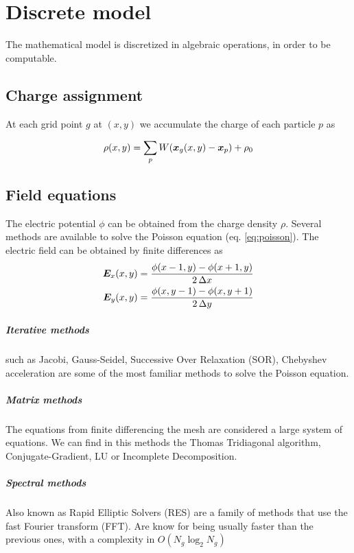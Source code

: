\chapter{Discrete model}
\label{ch:discrete-model}

The mathematical model is discretized in algebraic operations, in order to be 
computable.

\section{Charge assignment}

At each grid point $g$ at $(x,y)$ we accumulate the charge of each particle $p$ 
as

\begin{equation}
\rho(x, y) = \sum_p W(\bm{x}_g(x, y) - \bm{x}_p) + \rho_0
\end{equation}

\section{Field equations}

The electric potential $\phi$ can be obtained from the charge density $\rho$.  
Several methods are available to solve the Poisson equation (eq.  
\ref{eq:poisson}).
%
The electric field can be obtained by finite differences as
%
\begin{align}
\bm{E}_x(x,y) &= \frac{\phi(x-1,y) - \phi(x+1,y)}{2\,\Delta x} \\
\bm{E}_y(x,y) &= \frac{\phi(x,y-1) - \phi(x,y+1)}{2\,\Delta y}
\end{align}

\paragraph{Iterative  methods} such as Jacobi, Gauss-Seidel, Successive Over 
Relaxation (SOR), Chebyshev acceleration are some of the most familiar methods 
to solve the Poisson equation.

\paragraph{Matrix methods} The equations from finite differencing the mesh are 
considered a large system of equations. We can find in this methods the Thomas 
Tridiagonal algorithm, Conjugate-Gradient, LU or Incomplete Decomposition.

\paragraph{Spectral methods} Also known as Rapid Elliptic Solvers (RES) are a 
family of methods that use the fast Fourier transform (FFT). Are know for being 
usually faster than the previous ones, with a complexity in $O(N_g \log_2 N_g)$

